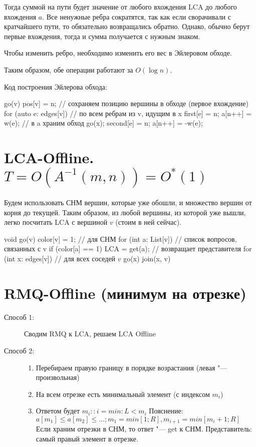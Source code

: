 Тогда суммой на пути будет значение от любого вхождения LCA до любого вхождения $a$.
Все ненужные ребра сократятся, так как если сворачивали с кратчайшего пути, то обязательно возвращались обратно.
Однако, обычно берут первые вхождения, тогда и сумма получается с нужным знаком.

Чтобы изменить ребро, необходимо изменить его вес в Эйлеровом обходе.

Таким образом, обе операции работают за $O(\log n)$.

Код построения Эйлерова обхода:

\begin{cppcode}
go(v) {
	pos[v] = n; // сохраняем позицию вершины в обходе (первое вхождение)
	for (auto e: edges[v]) { // по всем ребрам из v, идущим в x
		first[e] = n;
		a[n++] = w(e); // в a храним обход
		go(x);
		second[e] = n;
		a[n++] = -w(e);
	}
}
\end{cppcode}

\section{LCA-Offline. \texorpdfstring{$T = O\left(A^{-1}(m, n)\right) = O^*\left(1\right)$}{T = O(A^-1(m, n)) = O*(1)}}

Будем использовать СНМ вершин, которые уже обошли, и множество вершин от корня до текущей.
Таким образом, из любой вершины, из которой уже вышли, легко посчитать LCA с вершиной $v$ (стоим в ней сейчас).


\begin{cppcode}
void go(v) {
	color[v] = 1; // для СНМ
	for (int a: List[v]) // список вопросов, связанных с v
		if (color[a] == 1)
			LCA = get(a); // возвращает представителя
	for (int x: edges[v]) { // для всех соседей $v$
		go(x)
		join(x, v)
	}
}
\end{cppcode}

\section{RMQ-Offline (минимум на отрезке)}

\begin{description}
\item[Способ 1:]
	Сводим RMQ к LCA, решаем LCA Offline

\item[Способ 2:]
	\begin{enumerate}
	\item
		Перебираем правую границу в порядке возрастания (левая "--- произвольная)

	\item
		На всем отрезке есть минимальный элемент (с индексом $m_i$)

	\item
		Ответом будет $m_i\colon: i = min: L < m_i$
		Пояснение:   $a[m_1] \le a[m_2] \le ...; m_1 = 	{min}[1; R], m_{i+1} = 	{min}[m_i + 1; R]$
		Если храним отрезки в СНМ, то ответ "--- get к СНМ. Представитель: самый правый элемент в отрезке.
	\end{enumerate}
\end{description}

